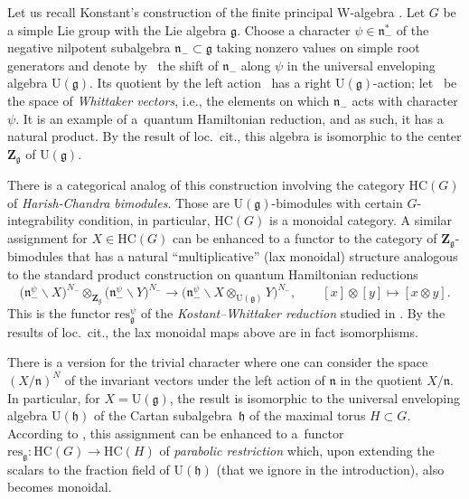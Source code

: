 \documentclass[pdftex]{sigma}
\numberwithin{equation}{section}
\newcommand{\Z}{\mathbf{Z}}
\newcommand{\g}{\mathfrak{g}}
\newcommand{\h}{\mathfrak{h}}
\newcommand{\n}{\mathfrak{n}}
\newcommand{\res}{\mathrm{res}}
\begin{document}
	Let us recall Konstant's construction of the finite principal W-algebra \cite{Kostant}. Let $G$ be a simple Lie group with the Lie algebra $\g$. Choose a character $\psi \in \n_-^*$ of the negative nilpotent subalgebra $ \n_- \subset \g $ taking nonzero values on simple root generators and denote by~\smash{$\n_-^{\psi} = \{x - \psi(x) \mid x\in \n_-\}$} the shift of $\n_-$ along $\psi$ in the universal enveloping algebra $\mathrm{U}(\g)$. Its quotient by the left action~\smash{$\n_-^{\psi} \backslash \mathrm{U}(\g)$} has a right $\mathrm{U}(\g)$-action; let~\smash{$\bigl(\n_-^{\psi} \backslash \mathrm{U}(\g)\bigr)^{N_-}$} be the space of \emph{Whittaker vectors}, i.e., the elements on which $\n_-$ acts with character $\psi$. It is an example of a~quantum Hamiltonian reduction, and as such, it has a natural product. By the result of loc.\ cit., this algebra is isomorphic to the center $\Z_{\g}$ of $\mathrm{U}(\g)$.
	
	There is a categorical analog of this construction involving the category $\mathrm{HC}(G)$ of \emph{Harish-Chandra bimodules}. Those are $\mathrm{U}(\g)$-bimodules with certain $G$-integrability condition, in particular, $\mathrm{HC}(G)$ is a monoidal category. A similar assignment \smash{$X \mapsto \bigl(\n_-^{\psi} \backslash X\bigr)^{N_-}$} for $X\in \mathrm{HC}(G)$ can be enhanced to a functor to the category of $\Z_{\g}$-bimodules that has a natural ``multiplicative'' (lax monoidal) structure analogous to the standard product construction on quantum Hamiltonian reductions
	\[
	\bigl(\n_-^{\psi} \backslash X\bigr)^{N_-} \otimes_{\Z_{g}} \bigl(\n_-^{\psi} \backslash Y\bigr)^{N_-} \rightarrow \bigl(\n_-^{\psi} \backslash X \otimes_{\mathrm{U}(\g)} Y\bigr)^{N_-}, \qquad [x] \otimes [y] \mapsto [x\otimes y].
	\]
	This is the functor $\res_{\g}^{\psi}$ of the \emph{Kostant--Whittaker reduction} studied in \cite{BezrukavnikovFinkelberg}. By the results of loc.\ cit., the lax monoidal maps above are in fact isomorphisms.
	
	There is a version for the trivial character where one can consider the space $(X/\n)^{N}$ of the invariant vectors under the left action of $\n$ in the quotient $X/\n$. In particular, for $X = \mathrm{U}(\g)$, the result is isomorphic to the universal enveloping algebra $\mathrm{U}(\h)$ of the Cartan subalgebra~$\h$ of the maximal torus $H\subset G$. According to \cite{KalmykovSafronov}, this assignment can be enhanced to a~functor~${\res_{\g} \colon \mathrm{HC}(G) \rightarrow \mathrm{HC}(H)}$ of \emph{parabolic restriction} which, upon extending the scalars to the fraction field of $\mathrm{U}(\h)$ (that we ignore in the introduction), also becomes monoidal.
	
\end{document}
